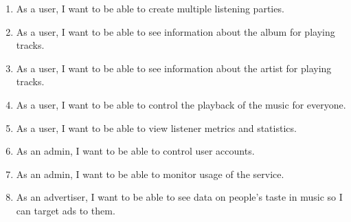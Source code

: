 \documentclass[11pt]{report}
\begin{document}
\begin{enumerate}
    \item As a user, I want to be able to create multiple listening parties.
    
    \item As a user, I want to be able to see information about the album for playing tracks.
    
    \item As a user, I want to be able to see information about the artist for playing tracks.

    \item As a user, I want to be able to control the playback of the music for everyone.
    
    \item As a user, I want to be able to view listener metrics and statistics.
    
    \item As an admin, I want to be able to control user accounts.
    
    \item As an admin, I want to be able to monitor usage of the service.
    
    \item As an advertiser, I want to be able to see data on people's taste in music so I can target ads to them.

\end{enumerate}
\end{document}
